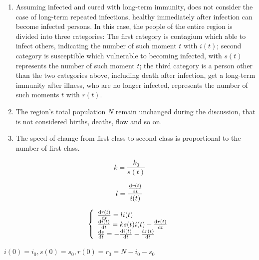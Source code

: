 \begin{enumerate}
  \item Assuming infected and cured with long-term immunity,
   does not consider the case of long-term repeated infections,
   healthy immediately after infection can become infected
   persons. In this case, the people of the entire region is
   divided into three categories: The first category is
   contagium which able to infect others, indicating
   the number of such moment $ t $ with $ i(t) $; second
   category is susceptible which vulnerable to becoming infected, 
   with $ s(t) $ represents the number of such moment $ t $;
   the third category is a person other than the two
   categories above, including death after infection,
   get a long-term immunity after illness, who are
   no longer infected, represents the number of such
   moments $ t $ with $ r(t) $.
  \item The region's total population $N$ remain unchanged
   during the discussion, that is not considered births, deaths,
   flow and so on.
  \item The speed of change from first class to second class is
   proportional to the number of first class.
\end{enumerate}
\begin{equation}
k=\frac{k_0}{s(t)}
\label{equ:4}
\end{equation}

\begin{equation}
l=\frac{\frac{{\mathrm{d}}r(t)}{{\mathrm{d}}t}}{i(t)}
\label{equ:5}
\end{equation}

\begin{equation}
\left\{
\begin{array}{l}
\frac{{\mathrm{d}}r(t)}{{\mathrm{d}}t}=li(t)\\
\frac{{\mathrm{d}}i(t)}{{\mathrm{d}}t}=ks(t)i(t)-\frac{{\mathrm{d}}r(t)}{{\mathrm{d}}t}\\
\frac{{\mathrm{d}}s}{{\mathrm{d}}t}=-\frac{{\mathrm{d}}i(t)}{{\mathrm{d}}t}-\frac{{\mathrm{d}}r(t)}{{\mathrm{d}}t}
\end{array}\right.
\label{equ:6}
\end{equation}

$ i(0)=i_0,s(0)=s_0,r(0)=r_0=N-i_0-s_0 $

